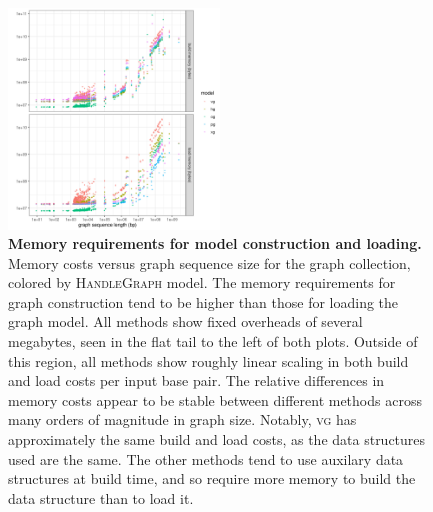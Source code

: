 \documentclass{bioinfo}
\begin{document}
\begin{figure}
  \centering
  \includegraphics[width=0.5\textwidth]{figures/build_and_load_memory.png}
  \caption{
    \label{fig:prof1}
    \textbf{Memory requirements for model construction and loading.}
    Memory costs versus graph sequence size for the graph collection, colored by \textsc{HandleGraph} model.
    The memory requirements for graph construction tend to be higher than those for loading the graph model.
    All methods show fixed overheads of several megabytes, seen in the flat tail to the left of both plots.
    Outside of this region, all methods show roughly linear scaling in both build and load costs per input base pair.
    The relative differences in memory costs appear to be stable between different methods across many orders of magnitude in graph size.
    Notably, \textsc{vg} has approximately the same build and load costs, as the data structures used are the same.
    The other methods tend to use auxilary data structures at build time, and so require more memory to build the data structure than to load it.
    }
\end{figure}
\end{document}
